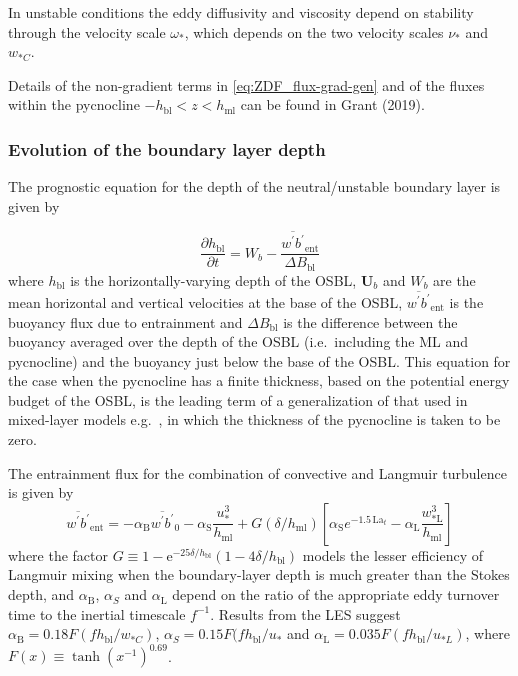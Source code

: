 \documentclass[../main/NEMO_manual]{subfiles}
\begin{document}
In unstable conditions the eddy diffusivity and viscosity depend on stability through the velocity scale $\omega_*$, which depends on the two velocity scales $\nu_*$ and $w_{*C}$.

Details of the non-gradient terms in \autoref{eq:ZDF_flux-grad-gen} and of the fluxes within the pycnocline $-h_{\mathrm{bl}}<z<h_{\mathrm{ml}}$ can be found in Grant (2019).

\subsubsection{Evolution of the boundary layer depth}

The prognostic equation for the depth of the neutral/unstable boundary layer is given by \iffalse \citep{grant+etal18?}, \fi

\begin{equation}
  \label{eq:ZDF_dhdt-unstable}
   \frac{\partial h_\mathrm{bl}}{\partial t} = W_b - \frac{{\overline{w^\prime b^\prime}}_\mathrm{ent}}{\Delta B_\mathrm{bl}}
\end{equation}
where $h_\mathrm{bl}$ is the horizontally-varying depth of the OSBL,
$\mathbf{U}_b$ and $W_b$ are the mean horizontal and vertical
velocities at the base of the OSBL, ${\overline{w^\prime
    b^\prime}}_\mathrm{ent}$ is the buoyancy flux due to entrainment
and $\Delta B_\mathrm{bl}$ is the difference between the buoyancy
averaged over the depth of the OSBL (i.e.\ including the ML and
pycnocline) and the buoyancy just below the base of the OSBL. This
equation for the case when the pycnocline has a finite thickness,
based on the potential energy budget of the OSBL, is the leading term
\iffalse \citep{grant+etal18?} \fi of a generalization of that used in mixed-layer
models e.g.\ \citet{kraus.turner_T67}, in which the thickness of the pycnocline is taken to be zero.

The entrainment flux for the combination of convective and Langmuir turbulence is given by
\begin{equation}
  \label{eq:ZDF_entrain-flux}
  {\overline{w^\prime b^\prime}}_\mathrm{ent} = -\alpha_{\mathrm{B}} {\overline{w^\prime b^\prime}}_0 - \alpha_{\mathrm{S}} \frac{u_*^3}{h_{\mathrm{ml}}}
  + G\left(\delta/h_{\mathrm{ml}} \right)\left[\alpha_{\mathrm{S}}e^{-1.5\, \mathrm{La}_t}-\alpha_{\mathrm{L}} \frac{w_{\mathrm{*L}}^3}{h_{\mathrm{ml}}}\right]
\end{equation}
where the factor $G\equiv 1 - \mathrm{e}^ {-25\delta/h_{\mathrm{bl}}}(1-4\delta/h_{\mathrm{bl}})$ models the lesser efficiency of Langmuir mixing when the boundary-layer depth is much greater than the Stokes depth, and $\alpha_{\mathrm{B}}$, $\alpha_{S}$  and $\alpha_{\mathrm{L}}$ depend on the ratio of the appropriate eddy turnover time to the inertial timescale $f^{-1}$. Results from the LES suggest $\alpha_{\mathrm{B}}=0.18 F(fh_{\mathrm{bl}}/w_{*C})$, $\alpha_{S}=0.15 F(fh_{\mathrm{bl}}/u_*$  and $\alpha_{\mathrm{L}}=0.035 F(fh_{\mathrm{bl}}/u_{*L})$, where $F(x)\equiv\tanh(x^{-1})^{0.69}$.
\end{document}
